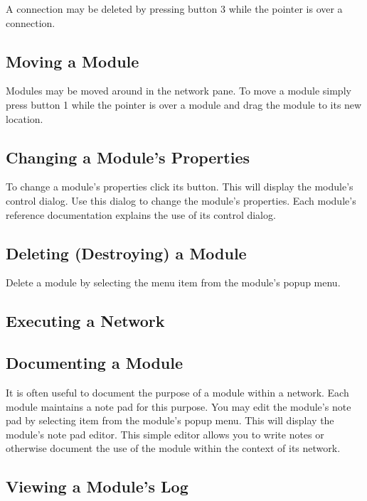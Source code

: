 A connection may be deleted by pressing button 3 while the pointer is
over a connection.

\subsection{Moving a  Module}
\label{sec:movemod}

Modules may be moved around in the network pane.  To move a module simply
press button 1 while the pointer is over a module and drag the module to
its new location.

\subsection{Changing a Module's Properties}
\label{sec:setmodprops}

To change a module's properties click its  button.  This will
display the module's control dialog.  Use this dialog to change the
module's properties.  Each module's reference documentation explains the
use of its control dialog.


\subsection{Deleting (Destroying) a Module}
\label{sec:deletemod}

Delete a module by selecting the  menu item from the
module's popup menu.

\subsection{Executing a Network}
\label{sec:executenet}


\subsection{Documenting a Module}
\label{sec:docmodule}

It is often useful to document the purpose of a module within a network.
Each module maintains a note pad for this purpose.  You may edit the
module's note pad by selecting  item from the module's
popup menu.  This will display the module's note pad editor.  This simple
editor allows you to write notes or otherwise document the use of the
module within the context of its network.

\subsection{Viewing a Module's Log}
\label{sec:viewmodslog}

